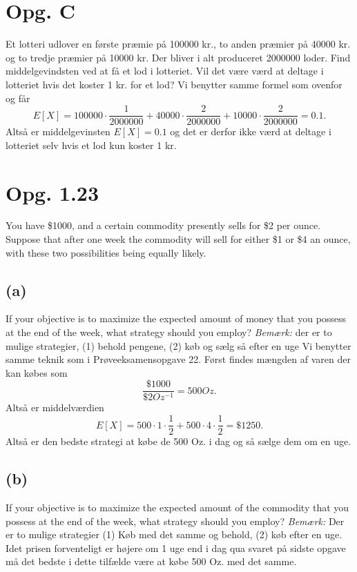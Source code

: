 \documentclass[12pt]{article}
\theoremstyle{definition}
\begin{document}
\section*{Opg. C}
Et lotteri udlover en første præmie på \num{100000} kr., to anden præmier på \num{40000} kr. og to tredje præmier på \num{10000} kr. Der bliver i alt produceret \num{2000000} loder. Find middelgevindsten ved at få et lod i lotteriet. Vil det være værd at deltage i lotteriet hvis det koster 1 kr. for et lod?
\bigbreak
Vi benytter samme formel som ovenfor og får
\[ 
  E[X] = \num{100000} \cdot \frac{1}{\num{2000000}} + \num{40000} \cdot \frac{2}{\num{2000000}} + \num{10000} \cdot \frac{2}{\num{2000000}} = \num{0,1} 
.\]
Altså er middelgevinsten $E[X] = \num{0,1}$ og det er derfor ikke værd at deltage i lotteriet selv hvis et lod kun koster 1 kr.

\section*{Opg. 1.23}
You have \$\num{1000}, and a certain commodity presently sells for \$2 per ounce. Suppose that after one week the commodity will sell for either \$1 or \$4 an ounce, with these two possibilities being equally likely.

\subsection*{(a)}
If your objective is to maximize the expected amount of money that you possess at the end of the week, what strategy should you employ?
\textit{Bemærk:} der er to mulige strategier, (1) behold pengene, (2) køb og sælg så efter en uge
\bigbreak
Vi benytter samme teknik som i Prøveeksamensopgave 22. Først findes mængden af varen der kan købes som
\[ 
  \frac{\$ 1000}{\$2 \unit{Oz^{-1}}} = 500 \unit{Oz}
.\]
Altså er middelværdien
\[ 
  E[X] = 500\cdot 1 \cdot \frac{1}{2} + 500 \cdot 4 \cdot \frac{1}{2} = \$ 1250 
.\]
Altså er den bedste strategi at købe de 500 Oz. i dag og så sælge dem om en uge.


\subsection*{(b)}
If your objective is to maximize the expected amount of the commodity that you possess at the end of the week, what strategy should you employ?
\textit{Bemærk:} Der er to mulige strategier (1) Køb med det samme og behold, (2) køb efter en uge.
\bigbreak
Idet prisen forventeligt er højere om 1 uge end i dag qua svaret på sidste opgave må det bedste i dette tilfælde være at købe 500 Oz. med det samme.
\end{document}
